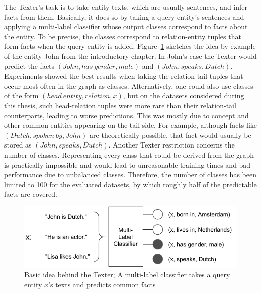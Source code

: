 The Texter's task is to take entity texts, which are usually sentences, and infer facts from them. Basically, it does so by taking a query entity's sentences and applying a multi-label classifier whose output classes correspond to facts about the entity. To be precise, the classes correspond to relation-entity tuples that form facts when the query entity is added. Figure~\ref{fig:4_approach/1_texter/texter_idea} sketches the idea by example of the entity John from the introductory chapter. In John's case the Texter would predict the facts $(John, has~gender, male)$ and $(John, speaks, Dutch)$. Experiments showed the best results when taking the relation-tail tuples that occur most often in the graph as classes. Alternatively, one could also use classes of the form $(head~entity, relation, x)$, but on the datasets considered during this thesis, such head-relation tuples were more rare than their relation-tail counterparts, leading to worse predictions. This was mostly due to concept and other common entities appearing on the tail side. For example, although facts like $(Dutch, spoken~by, John)$ are theoretically possible, that fact would usually be stored as $(John, speaks, Dutch)$. Another Texter restriction concerns the number of classes. Representing every class that could be derived from the graph is practically impossible and would lead to unreasonable training times and bad performance due to unbalanced classes. Therefore, the number of classes has been limited to 100 for the evaluated datasets, by which roughly half of the predictable facts are covered.

\begin{figure}[t]
    \centering
    \includegraphics[width=\textwidth]{4_approach/1_texter/texter_idea}
    \caption{Basic idea behind the Texter; A multi-label classifier takes a query entity $x$'s texts and predicts common facts}
    \label{fig:4_approach/1_texter/texter_idea}
\end{figure}

